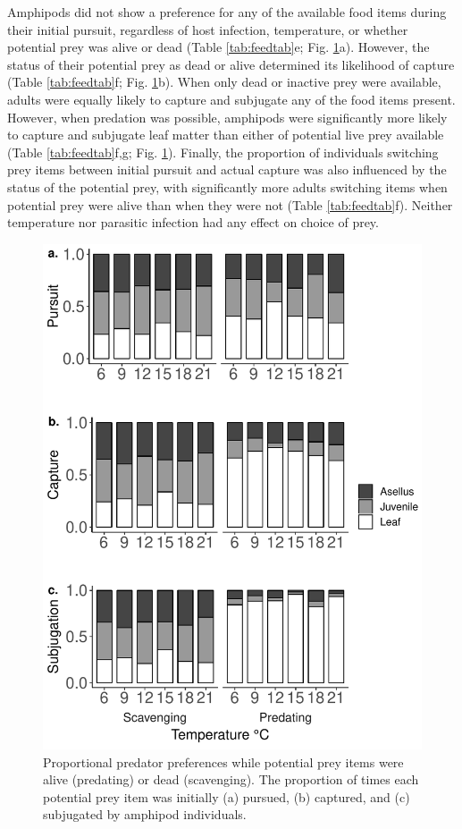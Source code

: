 Amphipods did not show a preference for any of the available food items during their initial pursuit, regardless of host infection, temperature, or whether potential prey was alive or dead (Table \ref{tab:feedtab}e; Fig. \ref{fig:feedpref}a). However, the status of their potential prey as dead or alive determined its likelihood of capture (Table \ref{tab:feedtab}f; Fig. \ref{fig:feedpref}b). When only dead or inactive prey were available, adults were equally likely to capture and subjugate any of the food items present. However, when predation was possible, amphipods were significantly more likely to capture and subjugate leaf matter than either of potential live prey available (Table \ref{tab:feedtab}f,g; Fig. \ref{fig:feedpref}). Finally, the proportion of individuals switching prey items between initial pursuit and actual capture was also influenced by the status of the potential prey, with significantly more adults switching items when potential prey were alive than when they were not (Table \ref{tab:feedtab}f). Neither temperature nor parasitic infection had any effect on choice of prey. 

\begin{figure}[H]
    \centering
    \includegraphics[keepaspectratio,width=\textwidth]{figures/ch4/feedpref_1.pdf}
  \caption [Proportional predator preferences while potential prey items were alive (predating) or dead (scavenging).]{Proportional predator preferences while potential prey items were alive (predating) or dead (scavenging). The proportion of times each potential prey item was initially (a) pursued, (b) captured, and (c) subjugated by amphipod individuals.} 
    \label{fig:feedpref}
\end{figure}

